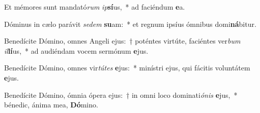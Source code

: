 \item Et mémores sunt mandató\textit{rum} \textit{ip}\textbf{sí}us,~* ad faciéndum \textbf{e}a.
\item Dóminus in cælo parávit \textit{se}\textit{dem} \textbf{su}am:~* et regnum ipsíus ómnibus domi\textbf{ná}bitur.
\item Benedícite Dómino, omnes Angeli ejus:~† poténtes virtúte, faciéntes ver\textit{bum} \textit{il}\textbf{lí}us,~* ad audiéndam vocem sermónum \textbf{e}jus.
\item Benedícite Dómino, omnes vir\textit{tú}\textit{tes} \textbf{e}jus:~* minístri ejus, qui fácitis voluntátem \textbf{e}jus.
\item Benedícite Dómino, ómnia ópera ejus:~† in omni loco dominati\textit{ó}\textit{nis} \textbf{e}jus,~* bénedic, ánima mea, \textbf{Dó}mino.
